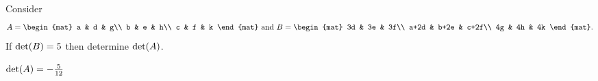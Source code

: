 
\begin{Exercise}[
name={},
title={}, 
difficulty=0,
origin={\cite{YL}}]
Consider
\[
A
=
\begin{mat}
a & d & g\\
b & e & h\\
c & f & k
\end{mat}
\text{ and }
B
=
\begin{mat}
3d & 3e & 3f\\
a+2d & b+2e & c+2f\\
4g & 4h & 4k
\end{mat}.
\]
If $\operatorname{det}(B)=5$ then determine $\operatorname{det}(A)$.


\end{Exercise}

\begin{Answer}
$
\operatorname{det}(A) = -\frac{5}{12}
$
\end{Answer}
